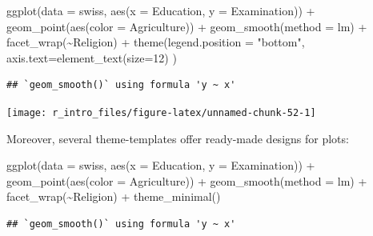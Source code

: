 \documentclass[
  12pt,
]{style/krantz}
\newenvironment{Shaded}{\begin{snugshade}}{\end{snugshade}}
\newcommand{\AttributeTok}[1]{\textcolor[rgb]{0.77,0.63,0.00}{#1}}
\newcommand{\DecValTok}[1]{\textcolor[rgb]{0.00,0.00,0.81}{#1}}
\newcommand{\FunctionTok}[1]{\textcolor[rgb]{0.00,0.00,0.00}{#1}}
\newcommand{\NormalTok}[1]{#1}
\newcommand{\SpecialCharTok}[1]{\textcolor[rgb]{0.00,0.00,0.00}{#1}}
\newcommand{\StringTok}[1]{\textcolor[rgb]{0.31,0.60,0.02}{#1}}
\begin{document}
\begin{Shaded}
\begin{Highlighting}[]
\FunctionTok{ggplot}\NormalTok{(}\AttributeTok{data =}\NormalTok{ swiss, }\FunctionTok{aes}\NormalTok{(}\AttributeTok{x =}\NormalTok{ Education, }\AttributeTok{y =}\NormalTok{ Examination)) }\SpecialCharTok{+} 
     \FunctionTok{geom\_point}\NormalTok{(}\FunctionTok{aes}\NormalTok{(}\AttributeTok{color =}\NormalTok{ Agriculture)) }\SpecialCharTok{+}
     \FunctionTok{geom\_smooth}\NormalTok{(}\AttributeTok{method =} \StringTok{\textquotesingle{}lm\textquotesingle{}}\NormalTok{) }\SpecialCharTok{+}
     \FunctionTok{facet\_wrap}\NormalTok{(}\SpecialCharTok{\textasciitilde{}}\NormalTok{Religion) }\SpecialCharTok{+}
     \FunctionTok{theme}\NormalTok{(}\AttributeTok{legend.position =} \StringTok{"bottom"}\NormalTok{, }\AttributeTok{axis.text=}\FunctionTok{element\_text}\NormalTok{(}\AttributeTok{size=}\DecValTok{12}\NormalTok{) ) }
\end{Highlighting}
\end{Shaded}

\begin{verbatim}
## `geom_smooth()` using formula 'y ~ x'
\end{verbatim}

\texttt{[image: r\_intro\_files/figure-latex/unnamed-chunk-52-1]}

Moreover, several theme-templates offer ready-made designs for plots:

\begin{Shaded}
\begin{Highlighting}[]
\FunctionTok{ggplot}\NormalTok{(}\AttributeTok{data =}\NormalTok{ swiss, }\FunctionTok{aes}\NormalTok{(}\AttributeTok{x =}\NormalTok{ Education, }\AttributeTok{y =}\NormalTok{ Examination)) }\SpecialCharTok{+} 
     \FunctionTok{geom\_point}\NormalTok{(}\FunctionTok{aes}\NormalTok{(}\AttributeTok{color =}\NormalTok{ Agriculture)) }\SpecialCharTok{+}
     \FunctionTok{geom\_smooth}\NormalTok{(}\AttributeTok{method =} \StringTok{\textquotesingle{}lm\textquotesingle{}}\NormalTok{) }\SpecialCharTok{+}
     \FunctionTok{facet\_wrap}\NormalTok{(}\SpecialCharTok{\textasciitilde{}}\NormalTok{Religion) }\SpecialCharTok{+}
     \FunctionTok{theme\_minimal}\NormalTok{()}
\end{Highlighting}
\end{Shaded}

\begin{verbatim}
## `geom_smooth()` using formula 'y ~ x'
\end{verbatim}
\end{document}
